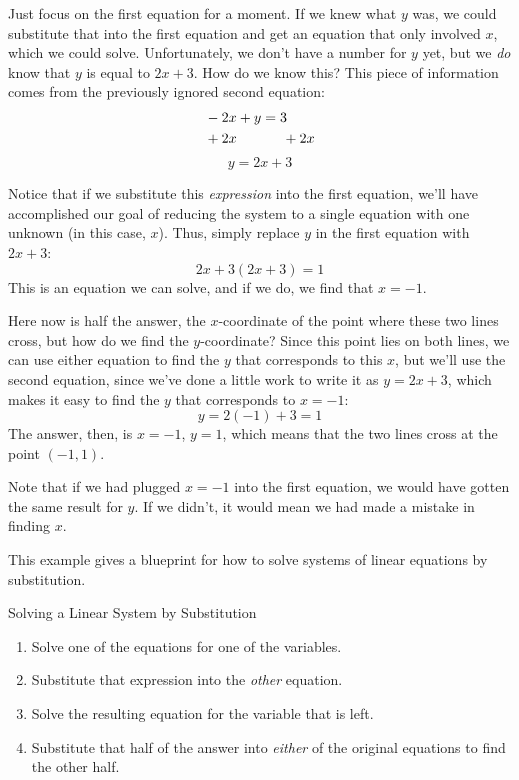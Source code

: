 Just focus on the first equation for a moment.  If we knew what $y$ was, we could substitute that into the first equation and get an equation that only involved $x$, which we could solve.  Unfortunately, we don't have a number for $y$ yet, but we \emph{do} know that $y$ is equal to $2x+3$.  How do we know this?  This piece of information comes from the previously ignored second equation:
\begin{align*}
&-2x+y=3 \\
&+2x \hspace{0.45in}+2x\\
\end{align*}
\[y=2x+3\]

Notice that if we substitute this \textit{expression} into the first equation, we'll have accomplished our goal of reducing the system to a single equation with one unknown (in this case, $x$).  Thus, simply replace $y$ in the first equation with $2x+3$:
\[2x+3(2x+3)=1\]
This is an equation we can solve, and if we do, we find that $x=-1.$

Here now is half the answer, the $x$-coordinate of the point where these two lines cross, but how do we find the $y$-coordinate?  Since this point lies on both lines, we can use either equation to find the $y$ that corresponds to this $x$, but we'll use the second equation, since we've done a little work to write it as $y=2x+3$, which makes it easy to find the $y$ that corresponds to $x=-1$:
\[y=2(-1)+3=1\]
The answer, then, is $x=-1$, $y=1$, which means that the two lines cross at the point $(-1,1)$.

Note that if we had plugged $x=-1$ into the first equation, we would have gotten the same result for $y$.  If we didn't, it would mean we had made a mistake in finding $x$.
\vspace{0.5in}

This example gives a blueprint for how to solve systems of linear equations by substitution.
\begin{proc}{Solving a Linear System by Substitution}
\begin{enumerate}
\item {}Solve one of the equations for one of the variables.
\item {}Substitute that expression into the \emph{other} equation.
\item Solve the resulting equation for the variable that is left.
\item {}Substitute that half of the answer into \emph{either} of the original equations to find the other half.
\end{enumerate}
\end{proc}
\vspace{0.4in}

